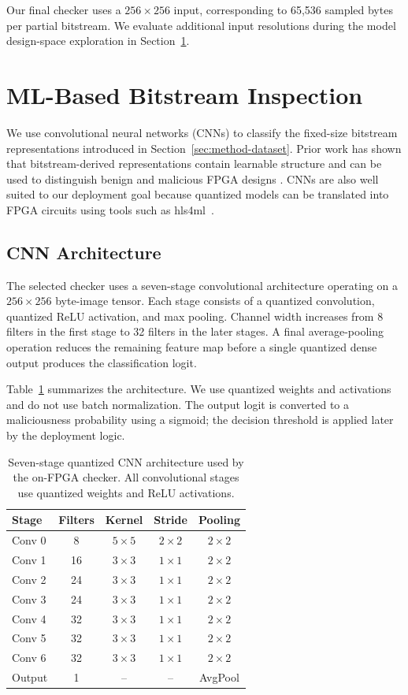 \documentclass[acmsmall]{acmart}
\begin{document}
Our final checker uses a $256 \times 256$ input, corresponding to 65,536 sampled
bytes per partial bitstream. We evaluate additional input resolutions during the
model design-space exploration in Section~\ref{sec:ml-inspection}.

\section{ML-Based Bitstream Inspection}
\label{sec:ml-inspection}

We use convolutional neural networks (CNNs) to classify the fixed-size
bitstream representations introduced in Section~\ref{sec:method-dataset}. Prior work
has shown that bitstream-derived representations contain learnable structure and
can be used to distinguish benign and malicious FPGA designs
\cite{rettkowski2019inspection,chaudhuri2022detection,
elnaggar2023learning,palumbo2022trojan}. CNNs are also well suited to our
deployment goal because quantized models can be translated into FPGA circuits
using tools such as hls4ml~\cite{duarte2018fast,aarrestad2021fast}.

\subsection{CNN Architecture}
\label{sec:cnn-architecture}

The selected checker uses a seven-stage convolutional architecture operating on
a $256\times256$ byte-image tensor. Each stage consists of a quantized
convolution, quantized ReLU activation, and max pooling. Channel width increases
from 8 filters in the first stage to 32 filters in the later stages. A final
average-pooling operation reduces the remaining feature map before a single
quantized dense output produces the classification logit.

Table~\ref{tab:cnn-architecture} summarizes the architecture. We use quantized
weights and activations and do not use batch normalization. The output
logit is converted to a maliciousness probability using a sigmoid; the decision
threshold is applied later by the deployment logic.

\begin{table}[t]
\centering
\caption{Seven-stage quantized CNN architecture used by the on-FPGA
checker. All convolutional stages use quantized weights and ReLU activations.}
\label{tab:cnn-architecture}
\small
\begin{tabular}{lcccc}
\toprule
Stage & Filters & Kernel & Stride & Pooling \tabularnewline
\midrule
Conv 0 & 8 & $5\times5$ & $2\times2$ & $2\times2$ \tabularnewline
Conv 1 & 16 & $3\times3$ & $1\times1$ & $2\times2$ \tabularnewline
Conv 2 & 24 & $3\times3$ & $1\times1$ & $2\times2$ \tabularnewline
Conv 3 & 24 & $3\times3$ & $1\times1$ & $2\times2$ \tabularnewline
Conv 4 & 32 & $3\times3$ & $1\times1$ & $2\times2$ \tabularnewline
Conv 5 & 32 & $3\times3$ & $1\times1$ & $2\times2$ \tabularnewline
Conv 6 & 32 & $3\times3$ & $1\times1$ & $2\times2$ \tabularnewline
Output & 1 & -- & -- & AvgPool \tabularnewline
\bottomrule
\end{tabular}
\end{table}
\end{document}
